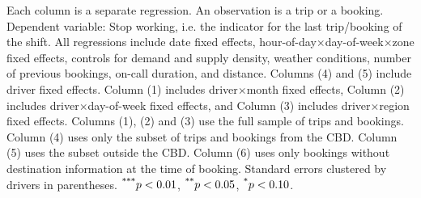 \documentclass[reviewmode]{restat}
\begin{document}
\begin{table}[]
{\begin{minipage}{18cm}
\begin{tablenotes}
        Each column is a separate regression. An observation is a trip or a booking. Dependent variable: Stop working, i.e. the indicator for the last trip/booking of the shift. All regressions include date fixed effects, hour-of-day\(\times\)day-of-week\(\times\)zone fixed effects, controls for demand and supply density, weather conditions, number of previous bookings, on-call duration, and distance. Columns (4) and (5) include driver fixed effects. Column (1) includes driver\(\times\)month fixed effects, Column (2) includes driver\(\times\)day-of-week fixed effects, and Column (3) includes driver\(\times\)region fixed effects. Columns (1), (2) and (3) use the full sample of trips and bookings. Column (4) uses only the subset of trips and bookings from the CBD. Column (5) uses the subset outside the CBD. Column (6) uses only bookings without destination information at the time of booking. Standard errors clustered by drivers in parentheses. $\textsuperscript{***}p < 0.01$, $\textsuperscript{**}p < 0.05$, $\textsuperscript{*}p < 0.10$. 
    \end{tablenotes}
    \label{tb:drfe}
        \end{minipage}%
    }  %
\end{table}

\clearpage
\end{document}
